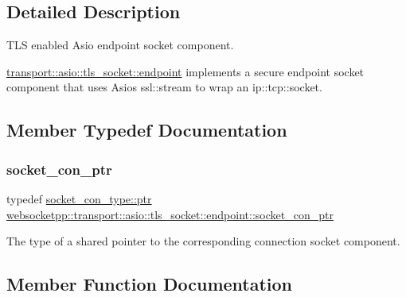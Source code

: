 \subsection{Detailed Description}
T\+LS enabled Asio endpoint socket component. 

\mbox{\hyperlink{classwebsocketpp_1_1transport_1_1asio_1_1tls__socket_1_1endpoint}{transport\+::asio\+::tls\+\_\+socket\+::endpoint}} implements a secure endpoint socket component that uses Asio\textquotesingle{}s ssl\+::stream to wrap an ip\+::tcp\+::socket. 

\subsection{Member Typedef Documentation}
\mbox{\label{classwebsocketpp_1_1transport_1_1asio_1_1tls__socket_1_1endpoint_ad0babd14e53524633840467d072710c3}} 
\subsubsection{\texorpdfstring{socket\+\_\+con\+\_\+ptr}{socket\_con\_ptr}}
{\footnotesize\ttfamily typedef \mbox{\hyperlink{classwebsocketpp_1_1transport_1_1asio_1_1tls__socket_1_1connection_a2aa605c27a476eba644e062dc5bc4f6d}{socket\+\_\+con\+\_\+type\+::ptr}} \mbox{\hyperlink{classwebsocketpp_1_1transport_1_1asio_1_1tls__socket_1_1endpoint_ad0babd14e53524633840467d072710c3}{websocketpp\+::transport\+::asio\+::tls\+\_\+socket\+::endpoint\+::socket\+\_\+con\+\_\+ptr}}}

The type of a shared pointer to the corresponding connection socket component. 

\subsection{Member Function Documentation}
\mbox{\label{classwebsocketpp_1_1transport_1_1asio_1_1tls__socket_1_1endpoint_a3fcd99c817947b9e23f0438c976edc64}} 
